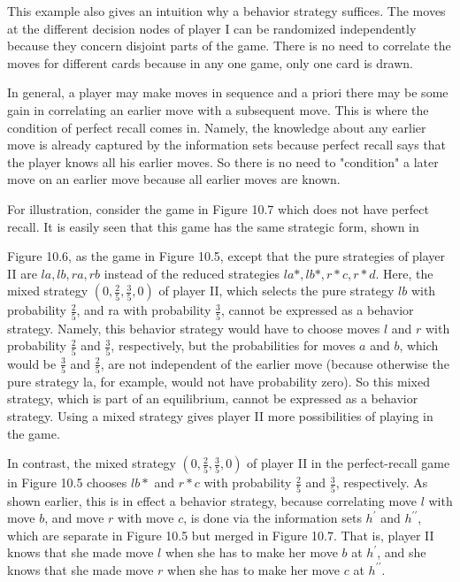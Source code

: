 \documentclass[12pt]{article}
\begin{document}
This example also gives an intuition why a behavior strategy suffices. The moves at the different decision nodes of player I can be randomized independently because they concern disjoint parts of the game. There is no need to correlate the moves for different cards because in any one game, only one card is drawn.

In general, a player may make moves in sequence and a priori there may be some gain in correlating an earlier move with a subsequent move. This is where the condition of perfect recall comes in. Namely, the knowledge about any earlier move is already captured by the information sets because perfect recall says that the player knows all his earlier moves. So there is no need to "condition" a later move on an earlier move because all earlier moves are known.

For illustration, consider the game in Figure 10.7 which does not have perfect recall. It is easily seen that this game has the same strategic form, shown in

Figure 10.6, as the game in Figure 10.5, except that the pure strategies of player II are $l a, l b, r a, r b$ instead of the reduced strategies $l a *, l b *, r * c, r * d$. Here, the mixed strategy $\left(0, \frac{2}{5}, \frac{3}{5}, 0\right)$ of player II, which selects the pure strategy $l b$ with probability $\frac{2}{5}$, and ra with probability $\frac{3}{5}$, cannot be expressed as a behavior strategy. Namely, this behavior strategy would have to choose moves $l$ and $r$ with probability $\frac{2}{5}$ and $\frac{3}{5}$, respectively, but the probabilities for moves $a$ and $b$, which would be $\frac{3}{5}$ and $\frac{2}{5}$, are not independent of the earlier move (because otherwise the pure strategy la, for example, would not have probability zero). So this mixed strategy, which is part of an equilibrium, cannot be expressed as a behavior strategy. Using a mixed strategy gives player II more possibilities of playing in the game.

In contrast, the mixed strategy $\left(0, \frac{2}{5}, \frac{3}{5}, 0\right)$ of player II in the perfect-recall game in Figure 10.5 chooses $l b *$ and $r * c$ with probability $\frac{2}{5}$ and $\frac{3}{5}$, respectively. As shown earlier, this is in effect a behavior strategy, because correlating move $l$ with move $b$, and move $r$ with move $c$, is done via the information sets $h^{\prime}$ and $h^{\prime \prime}$, which are separate in Figure 10.5 but merged in Figure 10.7. That is, player II knows that she made move $l$ when she has to make her move $b$ at $h^{\prime}$, and she knows that she made move $r$ when she has to make her move $c$ at $h^{\prime \prime}$.
\end{document}
